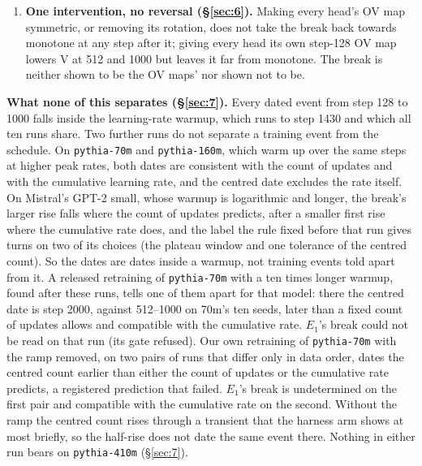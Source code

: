 \documentclass[11pt]{article}
\begin{document}
\begin{enumerate}
  \item \textbf{One intervention, no reversal (\S\ref{sec:6}).} Making every head's OV map symmetric, or removing its rotation, does not take the break back towards monotone at any step after it; giving every head its own step-128 OV map lowers V at 512 and 1000 but leaves it far from monotone. The break is neither shown to be the OV maps' nor shown not to be.
\end{enumerate}

\textbf{What none of this separates (\S\ref{sec:7}).} Every dated event from step 128 to 1000 falls inside the learning-rate warmup, which runs to step 1430 and which all ten runs share. Two further runs do not separate a training event from the schedule. On \texttt{pythia-70m} and \texttt{pythia-160m}, which warm up over the same steps at higher peak rates, both dates are consistent with the count of updates and with the cumulative learning rate, and the centred date excludes the rate itself. On Mistral's GPT-2 small, whose warmup is logarithmic and longer, the break's larger rise falls where the count of updates predicts, after a smaller first rise where the cumulative rate does, and the label the rule fixed before that run gives turns on two of its choices (the plateau window and one tolerance of the centred count). So the dates are dates inside a warmup, not training events told apart from it. A released retraining of \texttt{pythia-70m} with a ten times longer warmup, found after these runs, tells one of them apart for that model: there the centred date is step 2000, against 512--1000 on 70m's ten seeds, later than a fixed count of updates allows and compatible with the cumulative rate. $E_{1}$'s break could not be read on that run (its gate refused). Our own retraining of \texttt{pythia-70m} with the ramp removed, on two pairs of runs that differ only in data order, dates the centred count earlier than either the count of updates or the cumulative rate predicts, a registered prediction that failed. $E_{1}$'s break is undetermined on the first pair and compatible with the cumulative rate on the second. Without the ramp the centred count rises through a transient that the harness arm shows at most briefly, so the half-rise does not date the same event there. Nothing in either run bears on \texttt{pythia-410m} (\S\ref{sec:7}).
\end{document}
